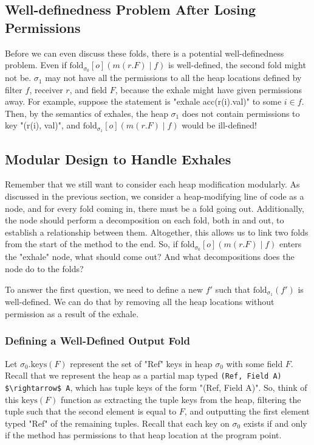 \documentclass[msc,oneside]{ubcthesis}
\begin{document}
\subsection{Well-definedness Problem After Losing Permissions}
Before we can even discuss these folds, there is a potential well-definedness problem. Even if $\textrm{fold}_{\sigma_0}[o]( m(r.F) \mid f)$ is well-defined, the second fold might not be. $\sigma_1$ may not have all the permissions to all the heap locations defined by filter $f$, receiver $r$, and field $F$, because the exhale might have given permissions away. For example, suppose the statement is "exhale acc(r(i).val)" to some $i \in f$. Then, by the semantics of exhales, the heap $\sigma_1$ does not contain permissions to key "(r(i), val)", and $\textrm{fold}_{\sigma_1}[o]( m(r.F) \mid f)$ would be ill-defined!

\subsection{Modular Design to Handle Exhales}
Remember that we still want to consider each heap modification modularly. As discussed in the previous section, we consider a heap-modifying line of code as a node, and for every fold coming in, there must be a fold going out. Additionally, the node should perform a decomposition on each fold, both in and out, to establish a relationship between them. Altogether, this allows us to link two folds from the start of the method to the end. So, if $\textrm{fold}_{\sigma_0}[o]( m(r.F) \mid f)$ enters the "exhale" node, what should come out? And what decompositions does the node do to the folds?

To answer the first question, we need to define a new $f'$ such that $\textrm{fold}_{\sigma_1}(f')$ is well-defined. We can do that by removing all the heap locations without permission as a result of the exhale. 

\subsubsection{Defining a Well-Defined Output Fold}
Let $\sigma_0.\textrm{keys}(F)$ represent the set of "Ref" keys in heap $\sigma_0$ with some field $F$. Recall that we represent the heap as a partial map typed \lstinline{(Ref, Field A) $\rightarrow$ A}, which has tuple keys of the form "(Ref, Field A)". So, think of this $\textrm{keys}(F)$ function as extracting the tuple keys from the heap, filtering the tuple such that the second element is equal to $F$, and outputting the first element typed "Ref" of the remaining tuples. Recall that each key on $\sigma_0$ exists if and only if the method has permissions to that heap location at the program point.
\end{document}
